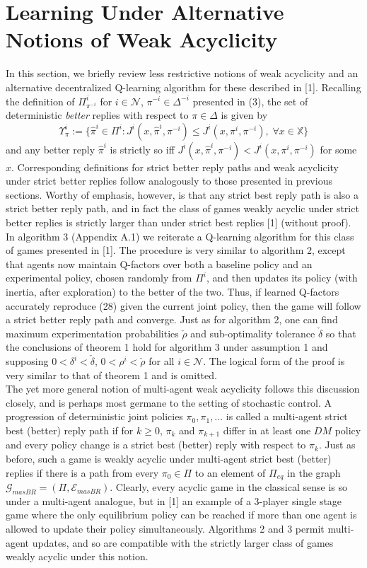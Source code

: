 \documentclass[10pt]{article}
\newcommand{\mbb}[1]{\mathbb{#1}}
\newcommand{\1}[1]{\mathbbm{1}_{#1}}
\newcommand{\mc}[1]{\mathcal{#1}}
\begin{document}
\section*{Learning Under Alternative Notions of Weak Acyclicity}
In this section, we briefly review less restrictive notions of weak acyclicity and an alternative decentralized Q-learning algorithm for these described in [1]. Recalling the definition of $\Pi^i_{\pi^{-i}}$ for $i\in\mc{N}$, $\pi^{-i}\in\Delta^{-i}$ presented in (3), the set of deterministic {\it better} replies with respect to $\pi\in\Delta$ is given by
\[\Upsilon^i_{\pi}:=\{\hat{\pi}^i\in\Pi^i:J^i(x,\hat{\pi}^i,\pi^{-i})\leq J^i(x,\pi^i,\pi^{-i}),\;\forall x\in\mbb{X}\}\tag{28}\]
and any better reply $\hat{\pi}^i$ is strictly so iff $J^i(x,\hat{\pi}^i,\pi^{-i})<J^i(x,\pi^i,\pi^{-i})$ for some $x$. Corresponding definitions for strict better reply paths and weak acyclicity under strict better replies follow analogously to those presented in previous sections. Worthy of emphasis, however, is that any strict best reply path is
also a strict better reply path, and in fact the class of games weakly acyclic under strict better replies is strictly larger than under strict best replies [1] (without proof). In algorithm 3 (Appendix A.1) we reiterate a Q-learning algorithm for this class of games presented in [1]. The procedure is very similar to algorithm 2, except that agents now maintain
Q-factors over both a baseline policy and an experimental policy, chosen randomly from $\Pi^i$, and then updates its policy (with inertia, after exploration) to the better of the two. Thus, if learned Q-factors accurately reproduce (28) given the current joint policy, then
the game will follow a strict better reply path and converge. Just as for algorithm 2, one can find maximum experimentation probabilities $\check{\rho}$ and sub-optimality tolerance $\check{\delta}$ so that the conclusions of theorem 1 hold for algorithm 3 under assumption 1 and supposing $0<\delta^i<\check{\delta}$, $0<\rho^i<\check{\rho}$ for all $i\in\mc{N}$. The logical form of the proof is very similar to that of theorem 1
and is omitted.\\[5pt]
The yet more general notion of multi-agent weak acyclicity follows this discussion closely, and is perhaps most germane to the setting of stochastic control. A progression of deterministic joint policies $\pi_0,\pi_1,\dots$ is called a multi-agent strict best (better) reply path if for $k\geq 0$, $\pi_k$ and $\pi_{k+1}$ differ in at least one $DM$ policy and every policy change is a strict best (better) reply with respect to $\pi_k$.
Just as before, such a game is weakly acyclic under multi-agent strict best (better) replies if there is a path from every $\pi_0\in\Pi$ to an element of $\Pi_{eq}$ in the graph $\mc{G}_{masBR}=(\Pi,\mc{E}_{masBR})$. Clearly, every acyclic game in the classical sense is so under a multi-agent analogue, but in [1] an example of a 3-player single stage game where the only equilibrium policy can be reached if more than one agent is allowed to update their policy
simultaneously. Algorithms 2 and 3 permit multi-agent updates, and so are compatible with the strictly larger class of games weakly acyclic under this notion.
\end{document}
